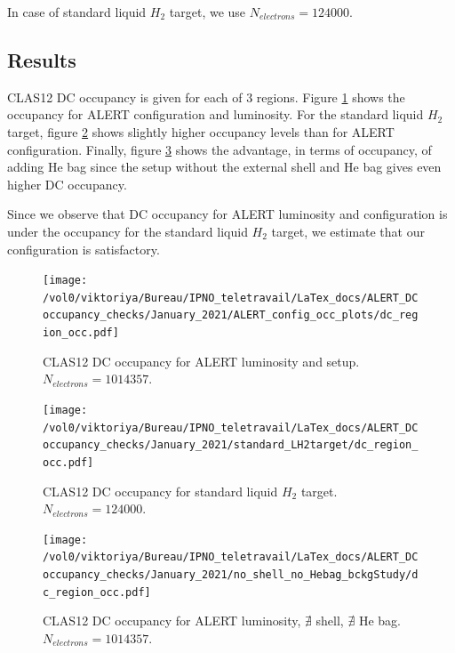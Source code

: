 \documentclass[11pt,a4paper,english]{article}
\begin{document}
In case of standard liquid $H_2$ target, we use $N_{electrons} = 124000$. 

	\subsection{Results}
CLAS12 DC occupancy is given for each of 3 regions. Figure \ref{fig_occ_alert} shows the occupancy for ALERT configuration and luminosity. For the standard liquid $H_2$ target, figure \ref{fig_occ_standardLH2} shows slightly higher occupancy levels than for ALERT configuration. Finally, figure \ref{fig_occ_noShellNobag} shows the advantage, in terms of occupancy, of adding He bag since the setup without the external shell and He bag gives even higher DC occupancy.   

Since we observe that DC occupancy for ALERT luminosity and configuration is under the occupancy for the standard liquid $H_2$ target, we estimate that our configuration is satisfactory.
\begin{figure}
\centering
\texttt{[image: /vol0/viktoriya/Bureau/IPNO\_teletravail/LaTex\_docs/ALERT\_DCoccupancy\_checks/January\_2021/ALERT\_config\_occ\_plots/dc\_region\_occ.pdf]}
\caption{CLAS12 DC occupancy for ALERT luminosity and setup. $N_{electrons} = 1014357$.}
\label{fig_occ_alert}
\end{figure}

\begin{figure}
\centering
\texttt{[image: /vol0/viktoriya/Bureau/IPNO\_teletravail/LaTex\_docs/ALERT\_DCoccupancy\_checks/January\_2021/standard\_LH2target/dc\_region\_occ.pdf]}
\caption{CLAS12 DC occupancy for standard liquid $H_2$ target. $N_{electrons} = 124000$.}
\label{fig_occ_standardLH2}
\end{figure}

\begin{figure}
\centering
\texttt{[image: /vol0/viktoriya/Bureau/IPNO\_teletravail/LaTex\_docs/ALERT\_DCoccupancy\_checks/January\_2021/no\_shell\_no\_Hebag\_bckgStudy/dc\_region\_occ.pdf]}
\caption{CLAS12 DC occupancy for ALERT luminosity, $\nexists$ shell, $\nexists$ He bag. $N_{electrons} = 1014357$.}
\label{fig_occ_noShellNobag}
\end{figure}





\end{document}
